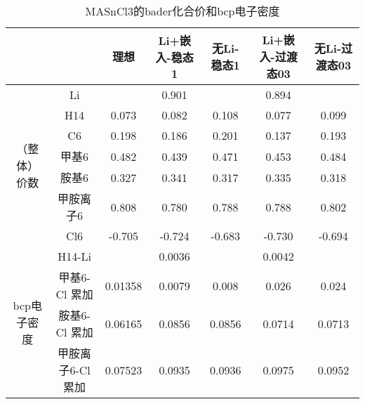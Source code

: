 \documentclass[UTF8, a4paper, 12pt, fontset=windows]{ctexart}
\begin{document}
        \begin{landscape}
            \begin{table}[h]
                \centering
                \begin{tabular}{ccccccc}
                \hline
                                        &             & 理想 & Li+嵌入-稳态1 & 无Li-稳态1 & Li+嵌入-过渡态03 & 无Li-过渡态03 \\ \hline
                \multirow{7}{*}{（整体）价数}  & Li          &           & 0.901          &                & 0.894            &                  \\
                                        & H14         & 0.073     & 0.082          & 0.108          & 0.077            & 0.099            \\
                                        & C6          & 0.198     & 0.186          & 0.201          & 0.137            & 0.193            \\
                                        & 甲基6         & 0.482     & 0.439          & 0.471          & 0.453            & 0.484            \\
                                        & 胺基6         & 0.327     & 0.341          & 0.317          & 0.335            & 0.318            \\
                                        & 甲胺离子6       & 0.808     & 0.780           & 0.788          & 0.788            & 0.802            \\
                                        & Cl6         & -0.705    & -0.724         & -0.683         & -0.730            & -0.694           \\ \hline
                \multirow{4}{*}{bcp电子密度} & H14-Li      &           & 0.0036         &                & 0.0042           &                  \\
                                        & 甲基6-Cl 累加   & 0.01358   & 0.0079         & 0.008          & 0.026            & 0.024            \\
                                        & 胺基6-Cl 累加   & 0.06165   & 0.0856         & 0.0856         & 0.0714           & 0.0713           \\
                                        & 甲胺离子6-Cl 累加 & 0.07523   & 0.0935         & 0.0936         & 0.0975           & 0.0952           \\ \hline
                \end{tabular}
                \caption{MASnCl3的bader化合价和bcp电子密度}
                \end{table}
        \end{landscape}
\end{document}
